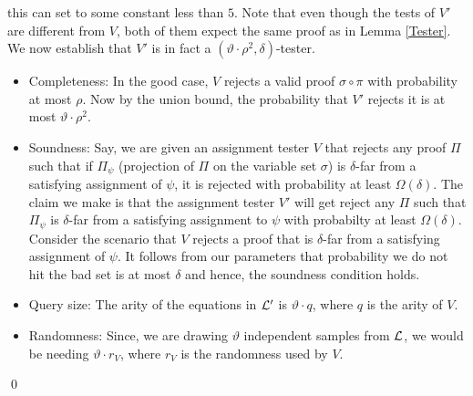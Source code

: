 this can set to some constant less than $5$.  Note that even though
the tests of $V'$ are different from $V$, both of them expect the same
proof as in Lemma \ref{Tester}. We now establish that $V'$ is in fact
a $(\vartheta \cdot \rho^2, {\delta})$-tester.
\begin{itemize}
\item Completeness: In the good case, $V$ rejects a valid proof
  $\sigma \circ \pi$ with probability at most $\rho$. Now by the union
  bound, the probability that $V'$ rejects it is at most $\vartheta
  \cdot \rho^2$.
 
\item Soundness: Say, we are given an assignment tester $V$ that
  rejects any proof $\Pi$ such that if $\Pi_\psi$ (projection of $\Pi$
  on the variable set $\sigma$) is $\delta$-far from a satisfying
  assignment of $\psi$, it is rejected with probability at least
  $\Omega(\delta)$.  The claim we make is that the assignment tester
  $V'$ will get reject any $\Pi$ such that $\Pi_\psi$ is $\delta$-far
  from a satisfying assignment to $\psi$ with probabilty at least
  $\Omega({\delta})$. Consider the scenario that $V$ rejects a proof
  that is $\delta$-far from a satisfying assignment of $\psi$.  It
  follows from our parameters that probability we do not hit the bad
  set is at most $\delta$ and hence, the soundness condition holds.

\item Query size: The arity of the equations in ${\cal L}'$ is $\vartheta
  \cdot q$, where $q$ is the arity of $V$.

\item Randomness: Since, we are drawing $\vartheta$ independent
  samples from ${\cal L}$, we would be needing $\vartheta \cdot r_V$, where
  $r_V$ is the randomness used by $V$.
\end{itemize}
 \qed

